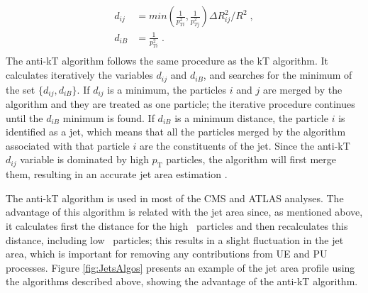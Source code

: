 \begin{itemize}
 \begin{equation}   \label{eq:antikt}
 \begin{aligned}
  d_{ij} &= min\left(\frac{1}{p_{Ti}^{2}},\frac{1}{p_{Tj}^{2}}\right)\Delta R_{ij}^{2}/R^{2} \;,\\
  d_{iB} &= \frac{1}{p_{Ti}^{2}} \;. \\
  \end{aligned}
  \end{equation}
\noindent The anti-kT algorithm follows the same procedure as the kT algorithm. It calculates 
iteratively the variables $d_{ij}$ and $d_{iB}$, and searches 
for the minimum of the set $\{d_{ij},d_{iB}\}$. If $d_{ij}$ is a minimum, the 
particles $i$ and $j$ are merged by the algorithm and they are treated as one 
particle; the iterative procedure continues until the $d_{iB}$ minimum is found. If $d_{iB}$ is a
minimum distance, the particle $i$ is identified as a jet, which means that
all the particles merged by the algorithm associated with that particle $i$ 
are the constituents of the jet. Since the anti-kT $d_{ij}$  variable is 
dominated by high $p_{\textrm{T}}$ particles, the algorithm will first merge them, resulting 
in an accurate jet area estimation \cite{AntiKTAlgorithm}. %
\end{itemize}

\noindent The anti-kT algorithm is used in most of the CMS and ATLAS analyses. The advantage of  
this algorithm is related with the jet area since, as mentioned above, it calculates first 
the distance for the high \pt~particles and then recalculates 
this distance, including low \pt~particles; this results in a slight 
fluctuation in the jet area, which is important for removing any 
contributions from UE and PU processes. Figure \ref{fig:JetsAlgos} presents an example of 
the jet area profile using the algorithms described above, showing the 
advantage of the anti-kT algorithm. \\


